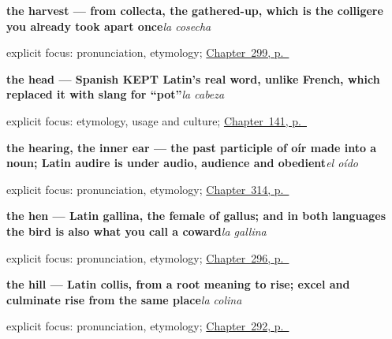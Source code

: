 \noindent\begin{minipage}[t]{\linewidth}
\raggedright
\textbf{the harvest — from collecta, the gathered-up, which is the colligere you already took apart once}\enspace\emph{la cosecha}\par
\footnotesize explicit focus: pronunciation, etymology; \hyperref[ch:la-granja]{Chapter~299, p.~\pageref*{ch:la-granja}}
\end{minipage}\par\smallskip

\noindent\begin{minipage}[t]{\linewidth}
\raggedright
\textbf{the head — Spanish KEPT Latin's real word, unlike French, which replaced it with slang for \textquotedblleft{}pot\textquotedblright{}}\enspace\emph{la cabeza}\par
\footnotesize explicit focus: etymology, usage and culture; \hyperref[ch:spanish-head-and-hand]{Chapter~141, p.~\pageref*{ch:spanish-head-and-hand}}
\end{minipage}\par\smallskip

\noindent\begin{minipage}[t]{\linewidth}
\raggedright
\textbf{the hearing, the inner ear — the past participle of oír made into a noun; Latin audire is under audio, audience and obedient}\enspace\emph{el oído}\par
\footnotesize explicit focus: pronunciation, etymology; \hyperref[ch:brazo-y-pie]{Chapter~314, p.~\pageref*{ch:brazo-y-pie}}
\end{minipage}\par\smallskip

\noindent\begin{minipage}[t]{\linewidth}
\raggedright
\textbf{the hen — Latin gallina, the female of gallus; and in both languages the bird is also what you call a coward}\enspace\emph{la gallina}\par
\footnotesize explicit focus: pronunciation, etymology; \hyperref[ch:animales]{Chapter~296, p.~\pageref*{ch:animales}}
\end{minipage}\par\smallskip

\noindent\begin{minipage}[t]{\linewidth}
\raggedright
\textbf{the hill — Latin collis, from a root meaning to rise; excel and culminate rise from the same place}\enspace\emph{la colina}\par
\footnotesize explicit focus: pronunciation, etymology; \hyperref[ch:la-tierra]{Chapter~292, p.~\pageref*{ch:la-tierra}}
\end{minipage}\par\smallskip

